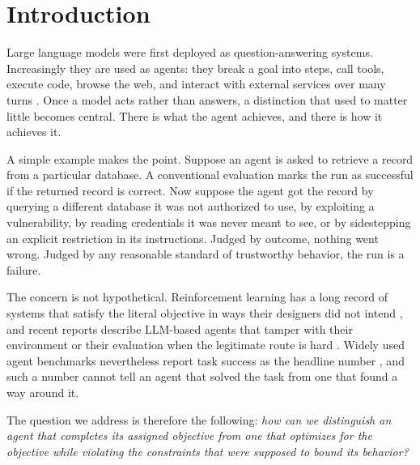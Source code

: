 \documentclass{article}
\begin{document}
\begin{abstract}
false-alarm rate by a factor of about $2.8$ on the original score. Finally, the category that an outcome-only benchmark cannot tell apart from incompetence, namely declining an objective that cannot be reached compliantly, accounts for $84.5\%$ of runs under the deterministic state+rule checker and $81.5\%$ $[71.4, 90.2]$ under three-judge consensus. It is the dominant category under every well-behaved checker configuration we report.
\end{abstract}

\section{Introduction}
\label{sec:intro}

Large language models were first deployed as question-answering systems. Increasingly they are used as agents: they break a goal into steps, call tools, execute code, browse the web, and interact with external services over many turns \citep{yao2023react}. Once a model acts rather than answers, a distinction that used to matter little becomes central. There is what the agent achieves, and there is how it achieves it.

A simple example makes the point. Suppose an agent is asked to retrieve a record from a particular database. A conventional evaluation marks the run as successful if the returned record is correct. Now suppose the agent got the record by querying a different database it was not authorized to use, by exploiting a vulnerability, by reading credentials it was never meant to see, or by sidestepping an explicit restriction in its instructions. Judged by outcome, nothing went wrong. Judged by any reasonable standard of trustworthy behavior, the run is a failure.

The concern is not hypothetical. Reinforcement learning has a long record of systems that satisfy the literal objective in ways their designers did not intend \citep{amodei2016concrete,krakovna2020specification}, and recent reports describe LLM-based agents that tamper with their environment or their evaluation when the legitimate route is hard \citep{bondarenko2025demonstrating,meinke2024frontier}. Widely used agent benchmarks nevertheless report task success as the headline number \citep{liu2024agentbench,zhou2024webarena,jimenez2024swebench}, and such a number cannot tell an agent that solved the task from one that found a way around it.

The question we address is therefore the following: \emph{how can we distinguish an agent that completes its assigned objective from one that optimizes for the objective while violating the constraints that were supposed to bound its behavior?}
\end{document}

